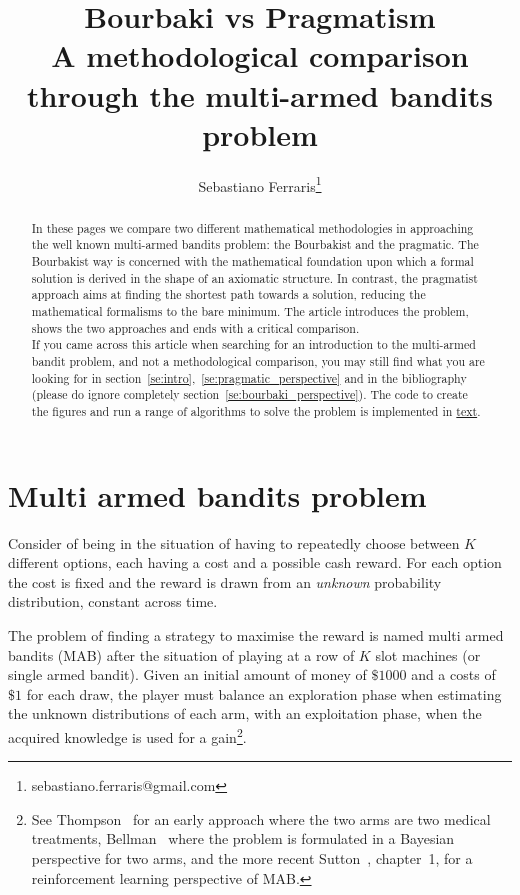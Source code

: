 \documentclass[]{scrartcl}
\title{Bourbaki vs Pragmatism \\ A methodological comparison through the multi-armed bandits problem}
\author{Sebastiano Ferraris\footnote{sebastiano.ferraris@gmail.com}}
\begin{document}
\maketitle

\begin{abstract}
In these pages we compare two different mathematical methodologies in approaching the well known multi-armed bandits problem: the Bourbakist and the pragmatic. The Bourbakist way is concerned with the mathematical foundation upon which a formal solution is derived in the shape of an axiomatic structure. In contrast, the pragmatist approach aims at finding the shortest path towards a solution, reducing the mathematical formalisms to the bare minimum.
The article introduces the problem, shows the two approaches and ends with a critical comparison. \\

\noindent
If you came across this article when searching for an introduction to the multi-armed bandit problem, and not a methodological comparison, you may still find what you are looking for in section~\ref{se:intro},~\ref{se:pragmatic_perspective} and in the bibliography (please do ignore completely section~\ref{se:bourbaki_perspective}). The code to create the figures and run a range of algorithms to solve the problem is implemented in \href{url}{text}. 
\end{abstract}


\section{Multi armed bandits problem}
\label{se:intro}
Consider of being in the situation of having to repeatedly choose between $K$ different options, each having a cost and a possible cash reward. For each option the cost is fixed and the reward is drawn from an \emph{unknown} probability distribution, constant across time.

The problem of finding a strategy to maximise the reward is named multi armed bandits (MAB) after the situation of playing at a row of $K$ slot machines (or single armed bandit). Given an initial amount of money of $\$1000$ and a costs of $\$1$ for each draw, the player must balance an exploration phase when estimating the unknown distributions of each arm, with an exploitation phase, when the acquired knowledge is used for a gain\footnote{See Thompson~\cite{thompson1933likelihood} for an early approach where the two arms are two medical treatments, Bellman~\cite{bellman1956problem} where the problem is formulated in a Bayesian perspective for two arms, and the more recent Sutton~\cite{sutton2018reinforcement}, chapter~1, for a reinforcement learning perspective of MAB.}.
\end{document}
